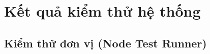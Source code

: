 


\section{Kết quả kiểm thử hệ thống}
\label{sec:system-testing-results}

\subsection{Kiểm thử đơn vị (Node Test Runner)}
\label{subsec:node-test-runner-results}

